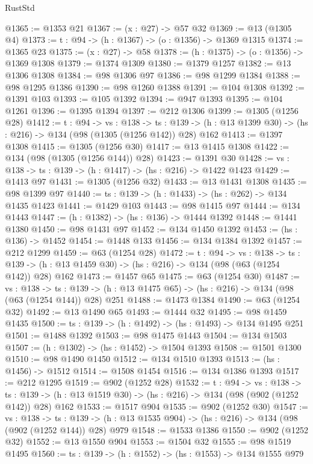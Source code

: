\begin{lexlean}{RustStd}
\begin{coremodule}
@1365 := @1353 @21
@1367 := (x : @27) -> @57 @32
@1369 := @13 (@1305 @4)
@1373 := {t : @94} -> (h : @1367) -> (o : @1356) -> @1369 @1315
@1374 := @1365 @23
@1375 := (x : @27) -> @58
@1378 := (h : @1375) -> (o : @1356) -> @1369 @1308
@1379 := @1374 @1309
@1380 := @1379 @1257
@1382 := @13 @1306 @1308
@1384 := @98 @1306 @97
@1386 := @98 @1299 @1384
@1388 := @98 @1295 @1386
@1390 := @98 @1260 @1388
@1391 := @104 @1308
@1392 := @1391 @103
@1393 := @105 @1392
@1394 := @947 @1393
@1395 := @104 @1261
@1396 := @1395 @1394
@1397 := @212 @1306
@1399 := @1305 (@1256 @28)
@1412 := {t : @94} ->
  {vs : @138} ->
  {ts : @139} -> (h : @13 @1399 @30) -> (hs : @216) -> @134 (@98 (@1305 (@1256 @142)) @28) @162
@1413 := @1397 @1308
@1415 := @1305 (@1256 @30)
@1417 := @13 @1415 @1308
@1422 := @134 (@98 (@1305 (@1256 @144)) @28)
@1423 := @1391 @30
@1428 := {vs : @138} -> {ts : @139} -> (h : @1417) -> (hs : @216) -> @1422 @1423
@1429 := @1413 @97
@1431 := @1305 (@1256 @32)
@1433 := @13 @1431 @1308
@1435 := @98 @1399 @97
@1440 := {ts : @139} -> (h : @1433) -> (hs : @262) -> @134 @1435 @1423
@1441 := @1429 @103
@1443 := @98 @1415 @97
@1444 := @134 @1443
@1447 := (h : @1382) -> (hs : @136) -> @1444 @1392
@1448 := @1441 @1380
@1450 := @98 @1431 @97
@1452 := @134 @1450 @1392
@1453 := (hs : @136) -> @1452
@1454 := @1448 @133
@1456 := @134 @1384 @1392
@1457 := @212 @1299
@1459 := @63 (@1254 @28)
@1472 := {t : @94} ->
  {vs : @138} ->
  {ts : @139} -> (h : @13 @1459 @30) -> (hs : @216) -> @134 (@98 (@63 (@1254 @142)) @28) @162
@1473 := @1457 @65
@1475 := @63 (@1254 @30)
@1487 := {vs : @138} ->
  {ts : @139} -> (h : @13 @1475 @65) -> (hs : @216) -> @134 (@98 (@63 (@1254 @144)) @28) @251
@1488 := @1473 @1384
@1490 := @63 (@1254 @32)
@1492 := @13 @1490 @65
@1493 := @1444 @32
@1495 := @98 @1459 @1435
@1500 := {ts : @139} -> (h : @1492) -> (hs : @1493) -> @134 @1495 @251
@1501 := @1488 @1392
@1503 := @98 @1475 @1443
@1504 := @134 @1503
@1507 := (h : @1302) -> (hs : @1452) -> @1504 @1393
@1508 := @1501 @1300
@1510 := @98 @1490 @1450
@1512 := @134 @1510 @1393
@1513 := (hs : @1456) -> @1512
@1514 := @1508 @1454
@1516 := @134 @1386 @1393
@1517 := @212 @1295
@1519 := @902 (@1252 @28)
@1532 := {t : @94} ->
  {vs : @138} ->
  {ts : @139} -> (h : @13 @1519 @30) -> (hs : @216) -> @134 (@98 (@902 (@1252 @142)) @28) @162
@1533 := @1517 @904
@1535 := @902 (@1252 @30)
@1547 := {vs : @138} ->
  {ts : @139} -> (h : @13 @1535 @904) -> (hs : @216) -> @134 (@98 (@902 (@1252 @144)) @28) @979
@1548 := @1533 @1386
@1550 := @902 (@1252 @32)
@1552 := @13 @1550 @904
@1553 := @1504 @32
@1555 := @98 @1519 @1495
@1560 := {ts : @139} -> (h : @1552) -> (hs : @1553) -> @134 @1555 @979

\end{coremodule}
\end{lexlean}
